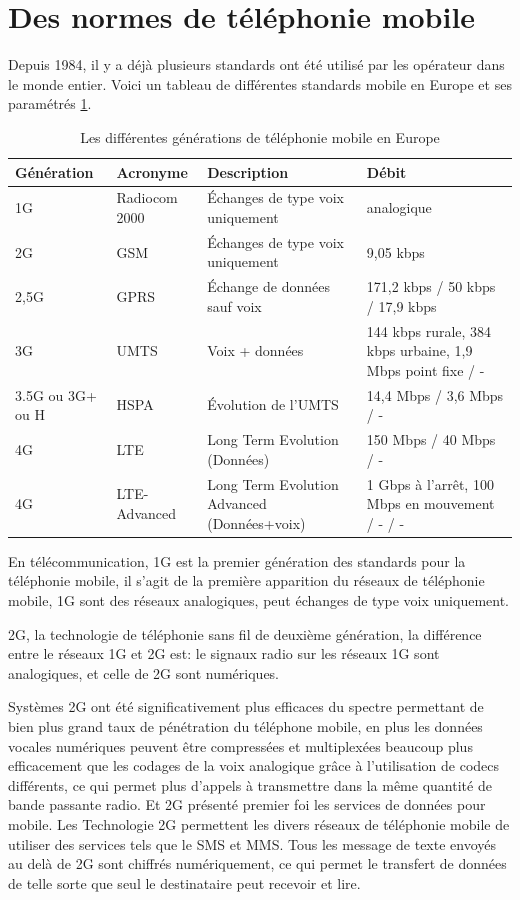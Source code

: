 
\section{Des normes de téléphonie mobile}
Depuis 1984, il y a déjà plusieurs standards ont été utilisé par les opérateur dans le monde entier. Voici un tableau de différentes standards mobile en Europe et ses paramétrés \ref{tbl:GMIE}. 
\begin{table}[H]
\begin{tabular}{|p{2cm}|p{2cm}|p{2cm}|p{4cm}|}
	\hline
	Génération&Acronyme&Description&Débit\\
	\hline
	1G		&Radiocom 2000	&Échanges de type voix uniquement&analogique\\
	\hline
	\hline
	2G		&GSM			&Échanges de type voix uniquement	&9,05 kbps\\
	\hline
	2,5G	&GPRS			&Échange de données sauf voix		&171,2 kbps / 50 kbps / 17,9 kbps\\
	\hline
	\hline
	3G		&UMTS			&Voix + données						&144 kbps rurale, 384 kbps urbaine, 1,9 Mbps point fixe / -\\
	\hline
	3.5G ou 3G+ ou H&HSPA	&Évolution de l'UMTS				&14,4 Mbps / 3,6 Mbps / -\\
	\hline
	\hline
	4G		&LTE			&Long Term Evolution (Données)				&150 Mbps / 40 Mbps / -\\
	\hline
	4G		&LTE-Advanced	&Long Term Evolution Advanced (Données+voix)		&1 Gbps à l'arrêt, 100 Mbps en mouvement / - / -\\
	\hline
\end{tabular}
\caption{Les différentes générations de téléphonie mobile en Europe}
 \label{tbl:GMIE}
\end{table}
En télécommunication, \textsf{1G} est la premier génération des standards pour la téléphonie mobile, il s'agit de la première apparition du réseaux de téléphonie mobile, 1G sont des réseaux analogiques, peut échanges de type voix uniquement.

\textsf{2G}, la technologie de téléphonie sans fil de deuxième génération, la différence entre le réseaux 1G et 2G est: le signaux radio sur les réseaux 1G sont analogiques, et celle de 2G sont numériques.

Systèmes 2G ont été significativement plus efficaces du spectre permettant de bien plus grand taux de pénétration du téléphone mobile, en plus les données vocales numériques peuvent être compressées et multiplexées beaucoup plus efficacement que les codages de la voix analogique grâce à l'utilisation de codecs différents, ce qui permet plus d'appels à transmettre dans la même quantité de bande passante radio. Et 2G présenté premier foi les services de données pour mobile. Les Technologie 2G permettent les divers réseaux de téléphonie mobile de utiliser des services tels que le SMS et MMS. Tous les message de texte envoyés au delà de 2G sont chiffrés numériquement, ce qui permet le transfert de données de telle sorte que seul le destinataire peut recevoir et lire.   

